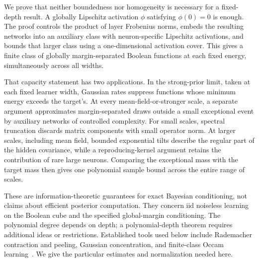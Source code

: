 \documentclass[11pt]{article}
\theoremstyle{remark}\newtheorem{remark}[theorem]{Remark}
\begin{document}
We prove that neither boundedness nor homogeneity is necessary for a fixed-depth result. A globally Lipschitz activation $\phi$ satisfying $\phi(0)=0$ is enough. The proof controls the product of layer Frobenius norms, embeds the resulting networks into an auxiliary class with neuron-specific Lipschitz activations, and bounds that larger class using a one-dimensional activation cover. This gives a finite class of globally margin-separated Boolean functions at each fixed energy, simultaneously across all widths.

That capacity statement has two applications. In the strong-prior limit, taken at each fixed learner width, Gaussian rates suppress functions whose minimum energy exceeds the target's. At every mean-field-or-stronger scale, a separate argument approximates margin-separated draws outside a small exceptional event by auxiliary networks of controlled complexity. For small scales, spectral truncation discards matrix components with small operator norm. At larger scales, including mean field, bounded exponential tilts describe the regular part of the hidden covariance, while a reproducing-kernel argument retains the contribution of rare large neurons. Comparing the exceptional mass with the target mass then gives one polynomial sample bound across the entire range of scales.

These are information-theoretic guarantees for exact Bayesian conditioning, not claims about efficient posterior computation. They concern iid noiseless learning on the Boolean cube and the specified global-margin conditioning. The polynomial degree depends on depth; a polynomial-depth theorem requires additional ideas or restrictions. Established tools used below include Rademacher contraction and peeling, Gaussian concentration, and finite-class Occam learning~\cite{golowich,blumer,borell}. We give the particular estimates and normalization needed here.
\end{document}
